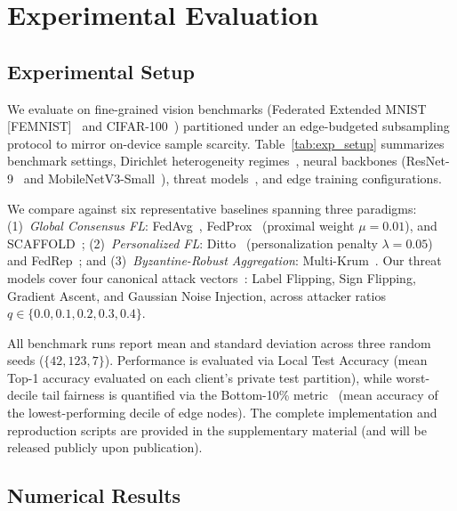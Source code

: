 \section{Experimental Evaluation}
\label{sec:experiments}

\subsection{Experimental Setup}
\label{sec:exp_setup}

We evaluate \fedhep{} on fine-grained vision benchmarks (Federated Extended MNIST [FEMNIST]~\cite{caldas2018leaf} and CIFAR-100~\cite{krizhevsky2009learning}) partitioned under an edge-budgeted subsampling protocol to mirror on-device sample scarcity. Table~\ref{tab:exp_setup} summarizes benchmark settings, Dirichlet heterogeneity regimes~\cite{hsu2019measuring}, neural backbones (ResNet-9~\cite{he2016deep} and MobileNetV3-Small~\cite{howard2019searching}), threat models~\cite{fang2020local,bhagoji2019analyzing,shejwalkar2021manipulating}, and edge training configurations.

We compare \fedhep{} against six representative baselines spanning three paradigms:
(1)~\textit{Global Consensus FL}: FedAvg~\cite{mcmahan2017communication}, FedProx~\cite{li2020federated} (proximal weight $\mu=0.01$), and SCAFFOLD~\cite{karimireddy2020scaffold};
(2)~\textit{Personalized FL}: Ditto~\cite{li2021ditto} (personalization penalty $\lambda=0.05$) and FedRep~\cite{collins2021exploiting}; and
(3)~\textit{Byzantine-Robust Aggregation}: Multi-Krum~\cite{blanchard2017machine}.
Our threat models cover four canonical attack vectors~\cite{fang2020local,bhagoji2019analyzing,shejwalkar2021manipulating}: Label Flipping, Sign Flipping, Gradient Ascent, and Gaussian Noise Injection, across attacker ratios $q \in \{0.0, 0.1, 0.2, 0.3, 0.4\}$.



All benchmark runs report mean and standard deviation across three random seeds ($\{42, 123, 7\}$). Performance is evaluated via Local Test Accuracy (mean Top-1 accuracy evaluated on each client's private test partition), while worst-decile tail fairness is quantified via the Bottom-10\% metric~\cite{li2020fair} (mean accuracy of the lowest-performing decile of edge nodes). The complete implementation and reproduction scripts are provided in the supplementary material (and will be released publicly upon publication).

\subsection{Numerical Results}
\label{sec:exp_results}

